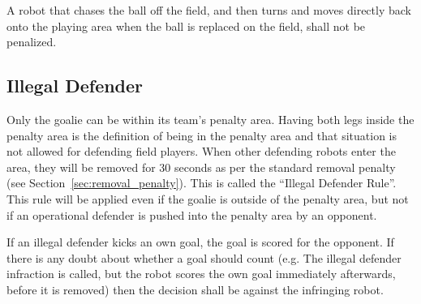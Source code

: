 \documentclass[12pt]{article}
\newcommand{\cf}{\mbox{cf.}\xspace}
\begin{document}
A robot that chases the ball off the field, and then turns and moves
directly back onto the playing area when the ball is replaced on the
field, shall not be penalized.

\subsection{Illegal Defender}

Only the goalie can be within its team's penalty area. Having both
legs inside the penalty area is the definition of being in the
penalty area and that situation is not allowed for defending field
players.  When other defending robots enter the area, they will be
removed for 30 seconds as per the standard removal penalty (see
Section~\ref{sec:removal_penalty}).  This is called the ``Illegal
Defender Rule''.  This rule will be applied even if the goalie is
outside of the penalty area, but not if an operational defender is
pushed into the penalty area by an opponent.

If an illegal defender kicks an own goal, the goal is scored for the
opponent.  If there is any doubt about whether a goal should count
(e.g. The illegal defender infraction is called, but the robot scores
the own goal immediately afterwards, before it is removed) then the
decision shall be against the infringing robot.

%
%
%
%
\end{document}
